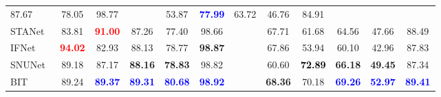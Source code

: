 \documentclass{article}
\begin{document}
\begin{table*}[htb]
\begin{tabular}{lccccccccccc}
                                    87.67 & 
                                    78.05 & 
                                    98.77 && 
                                    53.87 & 
                                    \textcolor{blue}{\bf 77.99} & 
                                    63.72 & 
                                    46.76 & 
                                    84.91\\
        STANet~\cite{CD_STANet}     & 83.81 & 
                                    \textcolor{red}{\bf 91.00} & 
                                    87.26 & 
                                    77.40 & 
                                    98.66 && 
                                    67.71 & 
                                    61.68 & 
                                    64.56 & 
                                    47.66 & 
                                    88.49\\
        IFNet~\cite{CD_IFNet} &     \textcolor{red}{\bf 94.02} & 
                                    82.93 & 
                                    88.13 & 
                                    78.77 & 
                                    {\bf 98.87} && 
                                    67.86 & 
                                    53.94 & 
                                    60.10 & 
                                    42.96 & 
                                    87.83 \\
        SNUNet~\cite{CD_SNUNet} &   89.18 & 
                                    87.17 & 
                                    {\bf 88.16} & 
                                    {\bf 78.83} & 
                                    98.82 && 
                                    60.60 & 
                                    \textcolor{black}{\bf 72.89} & 
                                    \bf 66.18 & 
                                    \bf 49.45 & 
                                    87.34\\
        BIT~\cite{transformer_cd} & 89.24 & 
                                    \textcolor{blue}{\bf 89.37} & 
                                    \textcolor{blue}{\bf 89.31} & 
                                    \textcolor{blue}{\bf 80.68} & 
                                    \textcolor{blue}{\bf 98.92} && 
                                    \bf 68.36 & 
                                    70.18 & 
                                    \textcolor{blue}{\bf 69.26} & 
                                    \textcolor{blue}{\bf52.97} & 
                                    \textcolor{blue}{\bf89.41}\\

\end{tabular}
\end{table*}
\end{document}
